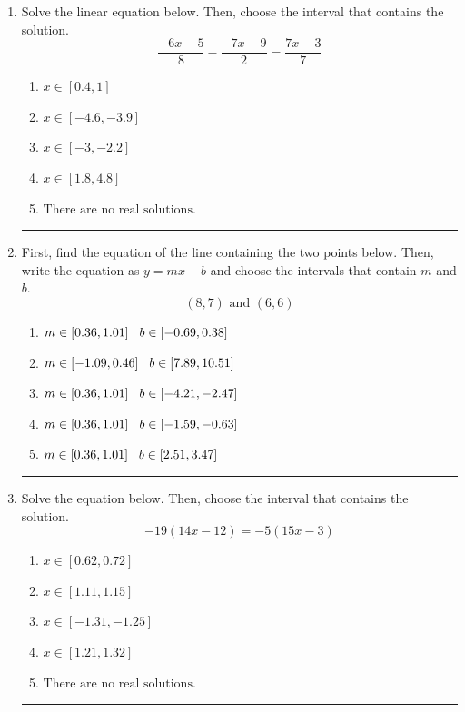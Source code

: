 \documentclass[14pt]{extbook}
\newcommand{\litem}[1]{\item#1\hspace*{-1cm}\rule{\textwidth}{0.4pt}}
\begin{document}
\begin{enumerate}
{\begin{enumerate}[label=\Alph*.]
\end{enumerate} }
\litem{
Solve the linear equation below. Then, choose the interval that contains the solution.\[ \frac{-6x -5}{8} - \frac{-7x -9}{2} = \frac{7x -3}{7} \]\begin{enumerate}[label=\Alph*.]
\item \( x \in [0.4, 1] \)
\item \( x \in [-4.6, -3.9] \)
\item \( x \in [-3, -2.2] \)
\item \( x \in [1.8, 4.8] \)
\item \( \text{There are no real solutions.} \)

\end{enumerate} }
\litem{
First, find the equation of the line containing the two points below. Then, write the equation as $ y=mx+b $ and choose the intervals that contain $m$ and $b$.\[ (8, 7) \text{ and } (6, 6) \]\begin{enumerate}[label=\Alph*.]
\item \( m \in [0.36, 1.01] \hspace*{3mm} b \in [-0.69, 0.38] \)
\item \( m \in [-1.09, 0.46] \hspace*{3mm} b \in [7.89, 10.51] \)
\item \( m \in [0.36, 1.01] \hspace*{3mm} b \in [-4.21, -2.47] \)
\item \( m \in [0.36, 1.01] \hspace*{3mm} b \in [-1.59, -0.63] \)
\item \( m \in [0.36, 1.01] \hspace*{3mm} b \in [2.51, 3.47] \)

\end{enumerate} }
\litem{
Solve the equation below. Then, choose the interval that contains the solution.\[ -19(14x -12) = -5(15x -3) \]\begin{enumerate}[label=\Alph*.]
\item \( x \in [0.62, 0.72] \)
\item \( x \in [1.11, 1.15] \)
\item \( x \in [-1.31, -1.25] \)
\item \( x \in [1.21, 1.32] \)
\item \( \text{There are no real solutions.} \)


\end{enumerate}}
\end{enumerate}
\end{document}
